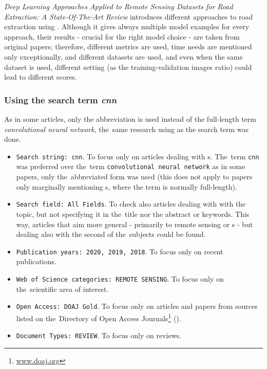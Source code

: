 \textit{Deep Learning Approaches Applied to Remote Sensing Datasets for Road Extraction: A State-Of-The-Art Review} introduces different approaches to road extraction using . Although it gives always multiple model examples for every approach, their results - crucial for the right model choice - are taken from original papers; therefore, different metrics are used, time needs are mentioned only exceptionally, and different datasets are used, and even when the same dataset is used, different setting (as the training-validation images ratio) could lead to different scores.

\subsubsection{Using the search term \textit{cnn}}
\label{wos-reviews-cnn}

As in some articles, only the abbreviation \textit{} is used instead of the full-length term \textit{convolutional neural network}, the~same research using \textit{} as the search term was done.

\begin{itemize}
	\item \verb|Search string: cnn|. To focus only on articles dealing with s. The~term \verb|cnn| was preferred over the~term \verb|convolutional neural network| as in some papers, only the~abbreviated form was used (this does not apply to papers only marginally mentioning s, where the term is normally full-length).
	\item \verb|Search field: All Fields|. To check also articles dealing with with the topic, but not specifying it in the~title nor the abstract or keywords. This way, articles that aim more general - primarily to remote sensing or s - but dealing also with the second of the~subjects could be found.
	\item \verb|Publication years: 2020, 2019, 2018|. To focus only on recent publications.
	\item \verb|Web of Science categories: REMOTE SENSING|. To focus only on the~scien\-ti\-fic area of interest.
	\item \verb|Open Access: DOAJ Gold|. To focus only on articles and papers from sources listed on the~Di\-rectory of Open Access Journals\footnote{\url{www.doaj.org}} ().
	\item \verb|Document Types: REVIEW|. To focus only on reviews.
\end{itemize}

